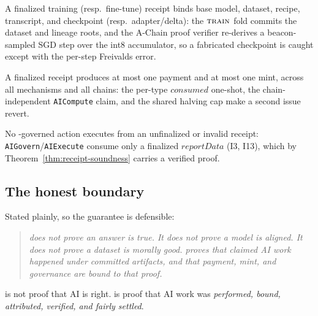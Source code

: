 \begin{corollary}
A finalized training (resp.\ fine-tune) receipt binds base model, dataset, recipe,
transcript, and checkpoint (resp.\ adapter/delta): the $\textsc{train}$ fold commits
the dataset and lineage roots, and the A-Chain proof verifier re-derives a
beacon-sampled SGD step over the int8 accumulator, so a fabricated checkpoint is
caught except with the per-step Freivalds error.
\end{corollary}

\begin{corollary}
A finalized receipt produces at most one payment and at most one mint, across all
mechanisms and all chains: the per-type $\mathit{consumed}$ one-shot, the chain-
independent \texttt{AICompute} claim, and the shared halving cap make a second issue
revert.
\end{corollary}

\begin{corollary}
No \PoAI{}-governed action executes from an unfinalized or invalid receipt:
\texttt{AIGovern}/\texttt{AIExecute} consume only a finalized $\mathit{reportData}$
(I3, I13), which by Theorem~\ref{thm:receipt-soundness} carries a verified proof.
\end{corollary}

\subsection{The honest boundary}
\label{sec:rs-boundary}

Stated plainly, so the guarantee is defensible:

\begin{quote}\itshape
\PoAI{} does not prove an answer is true. It does not prove a model is aligned. It
does not prove a dataset is morally good. \PoAI{} proves that claimed AI work
happened under committed artifacts, and that payment, mint, and governance are bound
to that proof.
\end{quote}

\begin{remark}
\PoAI{} is not proof that AI is right. \PoAI{} is proof that AI work was
\emph{performed, bound, attributed, verified, and fairly settled}.
\end{remark}
